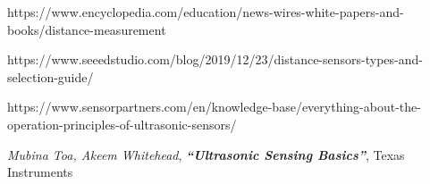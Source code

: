\documentclass[12pt, a4paper]{article}
\begin{document}
    


    \begin{thebibliography}{}	
        https://www.encyclopedia.com/education/news-wires-white-papers-and-books/distance-measurement

        https://www.seeedstudio.com/blog/2019/12/23/distance-sensors-types-and-selection-guide/

        https://www.sensorpartners.com/en/knowledge-base/everything-about-the-operation-principles-of-ultrasonic-sensors/ 
        
        \bibitem{}
        \textit{Mubina Toa, Akeem Whitehead}, \textbf{\textit{``Ultrasonic Sensing Basics''}}, Texas Instruments
    \end{thebibliography}
            
\end{document}

